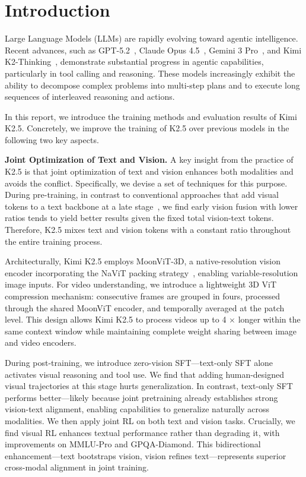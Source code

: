 \section{Introduction}

Large Language Models (LLMs) are rapidly evolving toward agentic intelligence. Recent advances, such as GPT-5.2~\citep{gpt52report}, Claude Opus 4.5~\citep{opus45report}, Gemini 3 Pro~\citep{gemini3pro}, and Kimi K2-Thinking~\citep{moonshotai2025kimi}, demonstrate substantial progress in agentic capabilities, particularly in tool calling and reasoning. These models increasingly exhibit the ability to decompose complex problems into multi-step plans and to execute long sequences of interleaved reasoning and actions.


In this report, we introduce the training methods and evaluation results of Kimi K2.5. Concretely, we improve the training of K2.5 over previous models in the following two key aspects.




\textbf{Joint Optimization of Text and Vision.} A key insight from the practice of K2.5 is that joint optimization of text and vision enhances both modalities and avoids the conflict. Specifically, we devise a set of techniques for this purpose. During pre-training, in contrast to conventional approaches that add visual tokens to a text backbone at a late stage~\citep{bai2025qwen3vltechnicalreport,guo2025seed15vltechnicalreport}, we find early vision fusion with lower ratios tends to yield better results given the fixed total vision-text tokens. Therefore, K2.5 mixes text and vision tokens with a constant ratio throughout the entire training process. 


Architecturally, Kimi K2.5 employs MoonViT-3D, a native-resolution vision encoder incorporating the NaViT packing strategy~\citep{dehghani2023patchnpacknavit}, enabling variable-resolution image inputs. For video understanding, we introduce a lightweight 3D ViT compression mechanism: consecutive frames are grouped in fours, processed through the shared MoonViT encoder, and temporally averaged at the patch level. This design allows Kimi K2.5 to process videos up to 4 $\times$ longer within the same context window while maintaining complete weight sharing between image and video encoders.


During post-training, we introduce zero-vision SFT---text-only SFT alone activates visual reasoning and tool use. 
We find that adding human-designed visual trajectories at this stage hurts generalization. 
In contrast, text-only SFT performs better—likely because joint pretraining already establishes strong vision-text alignment, enabling capabilities to generalize naturally across modalities.
We then apply joint RL on both text and vision tasks. 
Crucially, we find visual RL enhances textual performance rather than degrading it, with improvements on MMLU-Pro and GPQA-Diamond. This bidirectional enhancement—text bootstraps vision, vision refines text—represents superior cross-modal alignment in joint training.









